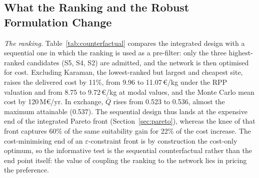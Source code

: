 \documentclass[preprint,12pt,authoryear]{elsarticle}
\begin{document}
\subsection{What the Ranking and the Robust Formulation Change}
\label{sec:robustness}
\textit{The ranking.} Table~\ref{tab:counterfactual} compares the integrated design with a sequential one in which the ranking is used as a pre-filter: only the three highest-ranked candidates (S5, S4, S2) are admitted, and the network is then optimised for cost. Excluding Karaman, the lowest-ranked but largest and cheapest site, raises the delivered cost by 11\%, from 9.96 to 11.07\,€/kg under the RPP valuation and from 8.75 to 9.72\,€/kg at modal values, and the Monte Carlo mean cost by 120\,M€/yr. In exchange, $\bar Q$ rises from 0.523 to 0.536, almost the maximum attainable (0.537). The sequential design thus lands at the expensive end of the integrated Pareto front (Section~\ref{sec:pareto}), whereas the knee of that front captures 60\% of the same suitability gain for 22\% of the cost increase. The cost-minimising end of an $\varepsilon$-constraint front is by construction the cost-only optimum, so the informative test is the sequential counterfactual rather than the end point itself: the value of coupling the ranking to the network lies in pricing the preference.

\begin{table}[htbp]
\centering
\caption{Integrated and sequential designs. Delivered cost is $E_{\text{Me}}[z]$ per kg delivered (modal values for the deterministic designs); $f_1$ is the robust objective in M€/yr.}
\label{tab:counterfactual}
\end{table}
\end{document}
